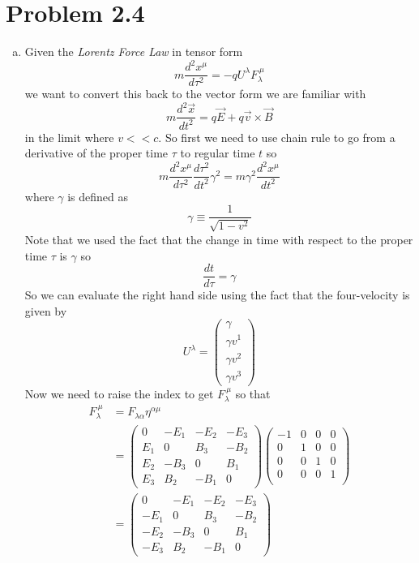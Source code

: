 \documentclass[11pt]{article}
\numberwithin{equation}{section}
\begin{document}
\section{Problem 2.4}
\begin{enumerate}[(a)]
\item
Given the \emph{Lorentz Force Law} in tensor form
$$m\frac{d^2x^{\mu}}{d\tau^2} = -qU^{\lambda}F_{\lambda}^{\ \mu}$$
we want to convert this back to the vector form we are familiar with
$$m\frac{d^2\vec{x}}{dt^2} = q\vec{E}+q\vec{v}\times\vec{B}$$
in the limit where $v<<c$. So first we need to use chain rule to go from a derivative of the proper time $\tau$ to regular time $t$ so
$$m\frac{d^2x^{\mu}}{d\tau^2}\frac{d\tau^2}{dt^2}\gamma^2 = m\gamma^2\frac{d^2x^{\mu}}{dt^2}$$
where $\gamma$ is defined as
$$\gamma\equiv\frac{1}{\sqrt{1-v^2}}$$ 
Note that we used the fact that the change in time with respect to the proper time $\tau$ is $\gamma$ so
$$\frac{dt}{d\tau} = \gamma$$
So we can evaluate the right hand side using the fact that the four-velocity is given by
$$U^{\lambda} = \left(\begin{array}{c}
		\gamma\\	\gamma v^1\\	\gamma v^2\\	\gamma v^3
		\end{array}\right)$$
Now we need to raise the index to get $F_{\lambda}^{\ \mu}$ so that
\begin{align*}
F_{\lambda}^{\ \mu} &= F_{\lambda\alpha}\eta^{\alpha\mu}\\
&= 
		\left(\begin{array}{cccc}
		0 &-E_1 &-E_2 &-E_3\\
		E_1 &0 &B_3 &-B_2\\
		E_2 &-B_3 &0 &B_1\\
		E_3 &B_2 &-B_1 &0
		\end{array}\right)
	\left(\begin{array}{cccc}
	-1 &0 &0 &0\\
	0 &1 &0 &0\\
	0 &0 &1 &0\\
	0 &0 &0 &1\\
	\end{array}\right)\\
&= 
		\left(\begin{array}{cccc}
		0 &-E_1 &-E_2 &-E_3\\
		-E_1 &0 &B_3 &-B_2\\
		-E_2 &-B_3 &0 &B_1\\
		-E_3 &B_2 &-B_1 &0
		\end{array}\right)
\end{align*}


\end{enumerate}
\end{document}
